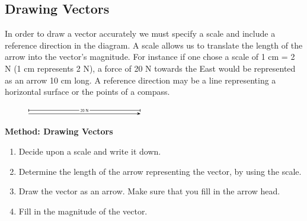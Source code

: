             \subsection{ Drawing Vectors}
            \nopagebreak
      \label{m38812*id187709}In order to draw a vector accurately we must specify a scale and
include a reference direction in the diagram. A scale allows us to
translate the length of the arrow into the vector's magnitude. For
instance if one chose a scale of 1 cm = 2 N (1 cm represents 2 N), a
force of 20 N towards the East would be represented as an arrow 10 cm
long. A reference direction may be a line representing a horizontal surface or the points of a compass.\par 
      \label{m38812*id187716}
    \setcounter{subfigure}{0}
	\begin{figure}[H] %
    \begin{center}
    \label{m38812*id187719!!!underscore!!!media}\label{m38812*id187719!!!underscore!!!printimage}\includegraphics[width=5cm]{col11305.imgs/m38812_PG11C1_010.png} %
      \vspace{2pt}
    \vspace{.1in}
    \end{center}
 \end{figure}       
      \par 
      \label{m38812*id187725}
        \textbf{Method: Drawing Vectors}
        \label{m38812*id187736}\begin{enumerate}[noitemsep, label=\textbf{\arabic*}. ] 
            \label{m38812*uid18}\item Decide upon a scale and write it down.
\label{m38812*uid19}\item Determine the length of the arrow representing the vector, by using the scale.
\label{m38812*uid20}\item Draw the vector as an arrow. Make sure that you fill in the arrow head.
\label{m38812*uid21}\item Fill in the magnitude of the vector.
\end{enumerate}
      \par 
\par
            \label{m38812*secfhsst!!!underscore!!!id189}\vspace{.5cm} 
      \noindent
